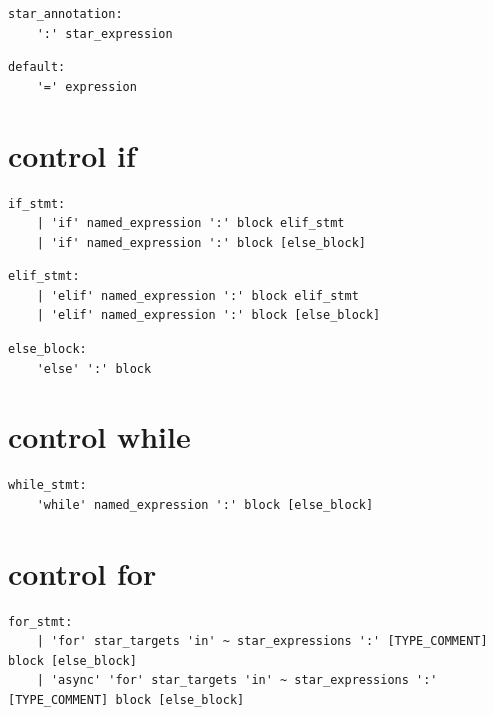 \noindent\textbf{\texttt{}}\par
\begin{lstlisting}
star_annotation:
    ':' star_expression
\end{lstlisting}

\noindent\textbf{\texttt{}}\par
\begin{lstlisting}
default:
    '=' expression
\end{lstlisting}

\section{control if}

\noindent\textbf{\texttt{}}\par
\begin{lstlisting}
if_stmt:
    | 'if' named_expression ':' block elif_stmt
    | 'if' named_expression ':' block [else_block]
\end{lstlisting}

\noindent\textbf{\texttt{}}\par
\begin{lstlisting}
elif_stmt:
    | 'elif' named_expression ':' block elif_stmt
    | 'elif' named_expression ':' block [else_block]
\end{lstlisting}

\noindent\textbf{\texttt{}}\par
\begin{lstlisting}
else_block:
    'else' ':' block
\end{lstlisting}

\section{control while}

\noindent\textbf{\texttt{}}\par
\begin{lstlisting}
while_stmt:
    'while' named_expression ':' block [else_block]
\end{lstlisting}

\section{control for}

\noindent\textbf{\texttt{}}\par
\begin{lstlisting}
for_stmt:
    | 'for' star_targets 'in' ~ star_expressions ':' [TYPE_COMMENT] block [else_block]
    | 'async' 'for' star_targets 'in' ~ star_expressions ':' [TYPE_COMMENT] block [else_block]
\end{lstlisting}

